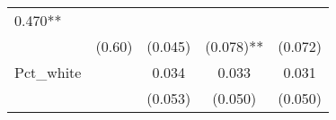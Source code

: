 \documentclass[12pt,twoside]{reedthesis}
\begin{document}
\begin{longtable}[]{@{}lcccc@{}}
\begin{minipage}[t]{0.14\columnwidth}
  0.470**\strut
  \end{minipage}\tabularnewline
  \begin{minipage}[t]{0.26\columnwidth}\raggedright\strut
  \strut
  \end{minipage} & \begin{minipage}[t]{0.12\columnwidth}\centering\strut
  (0.60)\strut
  \end{minipage} & \begin{minipage}[t]{0.13\columnwidth}\centering\strut
  (0.045)\strut
  \end{minipage} & \begin{minipage}[t]{0.14\columnwidth}\centering\strut
  (0.078)**\strut
  \end{minipage} & \begin{minipage}[t]{0.14\columnwidth}\centering\strut
  (0.072)\strut
  \end{minipage}\tabularnewline
  \begin{minipage}[t]{0.26\columnwidth}\raggedright\strut
  Pct\_white\strut
  \end{minipage} & \begin{minipage}[t]{0.12\columnwidth}\centering\strut
  \strut
  \end{minipage} & \begin{minipage}[t]{0.13\columnwidth}\centering\strut
  0.034\strut
  \end{minipage} & \begin{minipage}[t]{0.14\columnwidth}\centering\strut
  0.033\strut
  \end{minipage} & \begin{minipage}[t]{0.14\columnwidth}\centering\strut
  0.031\strut
  \end{minipage}\tabularnewline
  \begin{minipage}[t]{0.26\columnwidth}\raggedright\strut
  \strut
  \end{minipage} & \begin{minipage}[t]{0.12\columnwidth}\centering\strut
  \strut
  \end{minipage} & \begin{minipage}[t]{0.13\columnwidth}\centering\strut
  (0.053)\strut
  \end{minipage} & \begin{minipage}[t]{0.14\columnwidth}\centering\strut
  (0.050)\strut
  \end{minipage} & \begin{minipage}[t]{0.14\columnwidth}\centering\strut
  (0.050)\strut
  \end{minipage}\tabularnewline

\end{longtable}
\end{document}
